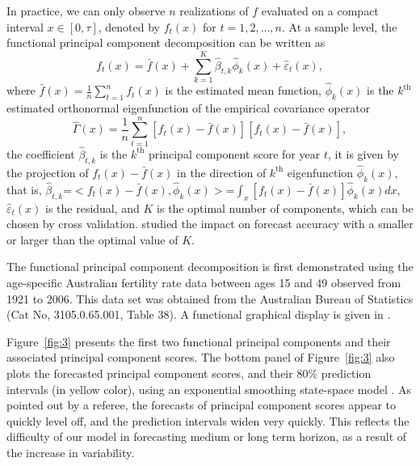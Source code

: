 \documentclass[nojss]{jss}
\begin{document}
In practice, we can only observe $n$ realizations of $f$ evaluated on a compact interval $x\in[0,\tau]$, denoted by $f_t(x)$ for $t=1,2,\dots,n$. At a sample level, the functional principal component decomposition can be written as
\begin{equation}
f_t(x) = \bar{f}(x) + \sum^K_{k=1}\widehat{\beta}_{t,k}\widehat{\phi}_k(x) + \widehat{\varepsilon}_t(x),\label{eq:61}
\end{equation}
where $\bar{f}(x)=\frac{1}{n}\sum^n_{t=1}f_t(x)$ is the estimated mean function, $\widehat{\phi}_k(x)$ is the $k^{\text{th}}$ estimated orthonormal eigenfunction of the empirical covariance operator
\begin{equation*}
  \widehat{\Gamma}(x)=\frac{1}{n}\sum^n_{t=1}[f_t(x)-\bar{f}(x)][f_t(x)-\bar{f}(x)],
\end{equation*}
the coefficient $\widehat{\beta}_{t,k}$ is the $k^{\text{th}}$ principal component score for year $t$, it is given by the projection of $f_t(x)-\bar{f}(x)$ in the direction of $k^{\text{th}}$ eigenfunction $\widehat{\phi}_k(x)$, that is, $\widehat{\beta}_{t,k}$=$<f_t(x)-\bar{f}(x), \widehat{\phi}_k(x)>$=$\int_x [f_t(x)-\bar{f}(x)]\widehat{\phi}_k(x)dx$, $\widehat{\varepsilon}_t(x)$ is the residual, and $K$ is the optimal number of components, which can be chosen by cross validation. \cite{HB08} studied the impact on forecast accuracy with a smaller or larger than the optimal value of $K$.

The functional principal component decomposition is first demonstrated using the age-specific Australian fertility rate data between ages 15 and 49 observed from 1921 to 2006. This data set was obtained from the Australian Bureau of Statistics (Cat No, 3105.0.65.001, Table 38). A functional graphical display is given in \cite{Shang11}.

Figure~\ref{fig:3} presents the first two functional principal components and their associated principal component scores. The bottom panel of Figure~\ref{fig:3} also plots the forecasted principal component scores, and their 80\% prediction intervals (in yellow color), using an exponential smoothing state-space model \citep{HKO+08}. As pointed out by a referee, the forecasts of principal component scores appear to quickly level off, and the prediction intervals widen very quickly. This reflects the difficulty of our model in forecasting medium or long term horizon, as a result of the increase in variability.

\end{document}
